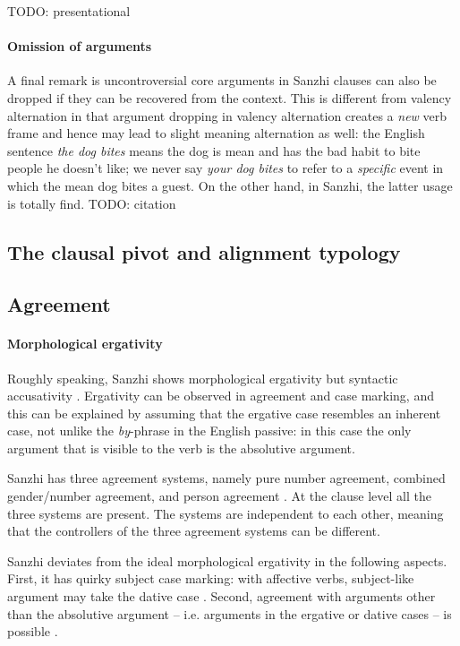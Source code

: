 \documentclass[a4paper, oneside, 12pt]{report}
\newcommand*{\citesec}[1]{\S~{#1}}
\newcommand*{\citetable}[1]{Table~{#1}}
\newcommand*{\citepage}[1]{p.~{#1}}
\newcommand{\form}[1]{\emph{#1}}
\begin{document}
TODO: presentational

\paragraph*{Omission of arguments} 
A final remark is uncontroversial core arguments in Sanzhi clauses can also be dropped 
if they can be recovered from the context.
This is different from valency alternation in that 
argument dropping in valency alternation creates a \emph{new} verb frame 
and hence may lead to slight meaning alternation as well:
the English sentence \form{the dog bites} means 
the dog is mean and has the bad habit to bite people he doesn't like; 
we never say \form{your dog bites} to refer to a \emph{specific} event 
in which the mean dog bites a guest.
On the other hand, in Sanzhi, the latter usage is totally find. TODO: citation 

\subsection{The clausal pivot and alignment typology} 

\subsection{Agreement}

\paragraph*{Morphological ergativity}
Roughly speaking, Sanzhi shows morphological ergativity 
but syntactic accusativity \citep[\citesec{22.3}]{forker2020grammar}.
Ergativity can be observed in agreement and case marking, 
and this can be explained by assuming that 
the ergative case resembles an inherent case, 
not unlike the \form{by}-phrase in the English passive:
in this case the only argument that is visible to the verb 
is the absolutive argument.

Sanzhi has three agreement systems, 
namely pure number agreement, 
combined gender/number agreement, 
and person agreement \citep[\citepage{373}]{forker2020grammar}.
At the clause level all the three systems are present.
The systems are independent to each other, 
meaning that the controllers of the three agreement systems can be different.


Sanzhi deviates from the ideal morphological ergativity
in the following aspects.
First, it has quirky subject case marking: 
with affective verbs, subject-like argument may take the dative case 
\citep[\citetable{19.1}]{forker2020grammar}.
Second, agreement with arguments other than the absolutive argument
-- i.e. arguments in the ergative or dative cases --
is possible \citep[\citesec{20.2.4}]{forker2020grammar}.
\end{document}
